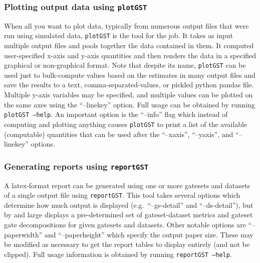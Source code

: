 \documentclass{article}[11pt]
\begin{document}
\subsubsection{Plotting output data using \texttt{plotGST}}
When all you want to plot data, typically from numerous output files that were run using simulated data, \texttt{plotGST} is the tool for the job.  It takes as input multiple output files and pools together the data contained in them.  It computed user-specified x-axis and y-axis quantities and then renders the data in a specified graphical or non-graphical format.  Note that despite its name, \texttt{plotGST} can be used just to bulk-compute values based on the estimates in many output files and save the results to a text, comma-separated-values, or pickled python pandas file.  Multiple y-axis variables may be specified, and multiple values can be plotted on the same axes using the ``--linekey'' option.  Full usage can be obtained by running \texttt{plotGST --help}.  An important option is the ``--info'' flag which instead of computing and plotting anything causes \texttt{plotGST} to print a list of the available (computable) quantities that can be used after the ``--xaxis'', ``--yaxis'', and ``--linekey'' options.

\subsubsection{Generating reports using \texttt{reportGST}}
A latex-format report can be generated using one or more gatesets and datasets of a single output file using \texttt{reportGST}.  This tool takes several options which determine how much output is displayed (e.g.~``--gs-detail'' and ``--ds-detail''), but by and large displays a pre-determined set of gateset-dataset metrics and gateset gate decompositions for given gatesets and datasets.  Other notable options are ``--paperwidth'' and ``--paperheight'' which specify the output paper size.  These may be modified as necessary to get the report tables to display entirely (and not be clipped).  Full usage information is obtained by running \texttt{reportGST --help}.
\end{document}
